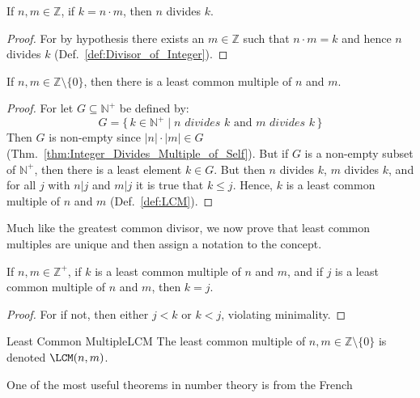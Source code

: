     \begin{theorem}
        \label{thm:Integer_Divides_Multiple_of_Self}%
        If $n,m\in\mathbb{Z}$, if $k=n\cdot{m}$, then $n$ divides $k$.
    \end{theorem}
    \begin{proof}
        For by hypothesis there exists an $m\in\mathbb{Z}$ such that
        $n\cdot{m}=k$ and hence $n$ divides $k$
        (Def.~\ref{def:Divisor_of_Integer}).
    \end{proof}
    \begin{theorem}
        \label{thm:LCM_Existence_Theorem}%
        If $n,m\in\mathbb{Z}\setminus\{0\}$, then there is a least
        common multiple of $n$ and $m$.
    \end{theorem}
    \begin{proof}
        For let $G\subseteq\mathbb{N}^{+}$ be defined by:
        \begin{equation}
            G=\{\,k\in\mathbb{N}^{+}\;|\;
                n\textit{ divides }k\textrm{ and }
                m\textit{ divides }k\,\}
        \end{equation}
        Then $G$ is non-empty since $|n|\cdot|m|\in{G}$
        (Thm.~\ref{thm:Integer_Divides_Multiple_of_Self}). But if $G$ is
        a non-empty subset of $\mathbb{N}^{+}$, then there is a least
        element $k\in{G}$. But then $n$ divides $k$, $m$ divides $k$,
        and for all $j$ with $n|j$ and $m|j$ it is true that
        $k\leq{j}$. Hence, $k$ is a least common multiple of $n$ and $m$
        (Def.~\ref{def:LCM}).
    \end{proof}
    Much like the greatest common divisor, we now prove that least
    common multiples are unique and then assign a notation to the
    concept.
    \begin{theorem}
        \label{thm:LCM_Unique}%
        If $n,m\in\mathbb{Z}^{+}$, if $k$ is a least common multiple of
        $n$ and $m$, and if $j$ is a least common multiple of $n$ and
        $m$, then $k=j$.
    \end{theorem}
    \begin{proof}
        For if not, then either $j<k$ or $k<j$, violating minimality.
    \end{proof}
    \begin{fnotation}{Least Common Multiple}{LCM}
        The least common multiple of $n,m\in\mathbb{Z}\setminus\{0\}$ is
        denoted $\LCM(n,m)$.
    \end{fnotation}
    One of the most useful theorems in number theory is from the French
